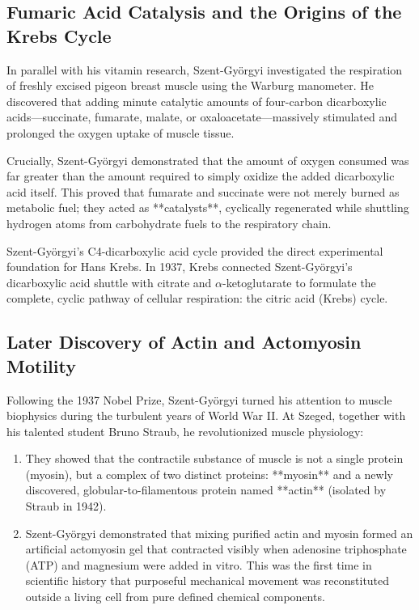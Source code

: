 \subsection{Fumaric Acid Catalysis and the Origins of the Krebs Cycle}

In parallel with his vitamin research, Szent-Györgyi investigated the respiration of freshly excised pigeon breast muscle using the Warburg manometer. He discovered that adding minute catalytic amounts of four-carbon dicarboxylic acids—succinate, fumarate, malate, or oxaloacetate—massively stimulated and prolonged the oxygen uptake of muscle tissue.

Crucially, Szent-Györgyi demonstrated that the amount of oxygen consumed was far greater than the amount required to simply oxidize the added dicarboxylic acid itself. This proved that fumarate and succinate were not merely burned as metabolic fuel; they acted as **catalysts**, cyclically regenerated while shuttling hydrogen atoms from carbohydrate fuels to the respiratory chain. 

Szent-Györgyi's C4-dicarboxylic acid cycle provided the direct experimental foundation for Hans Krebs. In 1937, Krebs connected Szent-Györgyi's dicarboxylic acid shuttle with citrate and $\alpha$-ketoglutarate to formulate the complete, cyclic pathway of cellular respiration: the citric acid (Krebs) cycle.

\subsection{Later Discovery of Actin and Actomyosin Motility}

Following the 1937 Nobel Prize, Szent-Györgyi turned his attention to muscle biophysics during the turbulent years of World War II. At Szeged, together with his talented student Bruno Straub, he revolutionized muscle physiology:
\begin{enumerate}
    \item They showed that the contractile substance of muscle is not a single protein (myosin), but a complex of two distinct proteins: **myosin** and a newly discovered, globular-to-filamentous protein named **actin** (isolated by Straub in 1942).
    \item Szent-Györgyi demonstrated that mixing purified actin and myosin formed an artificial actomyosin gel that contracted visibly when adenosine triphosphate (ATP) and magnesium were added in vitro. This was the first time in scientific history that purposeful mechanical movement was reconstituted outside a living cell from pure defined chemical components.
\end{enumerate}

